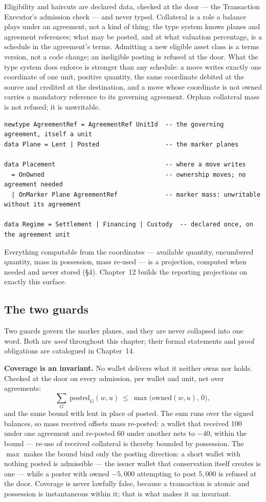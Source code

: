Eligibility and haircuts are declared data, checked at the door --- the
Transaction Executor's admission check --- and never typed. Collateral is a
role a balance plays under an agreement, not a kind of thing: the type system
knows planes and agreement references; what may be posted, and at what
valuation percentage, is a schedule in the agreement's terms. Admitting a new
eligible asset class is a terms version, not a code change; an ineligible
posting is refused at the door. What the type system does enforce is stronger
than any schedule: a move writes exactly one coordinate of one unit, positive
quantity, the same coordinate debited at the source and credited at the
destination, and a move whose coordinate is not owned carries a mandatory
reference to its governing agreement. Orphan collateral mass is not refused;
it is unwritable.

\begin{lstlisting}
newtype AgreementRef = AgreementRef UnitId  -- the governing agreement, itself a unit
data Plane = Lent | Posted                  -- the marker planes

data Placement                              -- where a move writes
  = OnOwned                                 -- ownership moves; no agreement needed
  | OnMarker Plane AgreementRef             -- marker mass: unwritable without its agreement

data Regime = Settlement | Financing | Custody  -- declared once, on the agreement unit
\end{lstlisting}

Everything computable from the coordinates --- available quantity, encumbered
quantity, mass in possession, mass re-used --- is a projection, computed when
needed and never stored (\S4). Chapter~12 builds the reporting projections on
exactly this surface.

\subsection{The two guards}

Two guards govern the marker planes, and they are never collapsed into one
word. Both are \emph{used} throughout this chapter; their formal statements and
proof obligations are catalogued in Chapter~14.

\textbf{Coverage is an invariant.} No wallet delivers what it neither owns nor
holds. Checked at the door on every admission, per wallet and unit, net over
agreements:
\[
\sum_{G}\ \mathrm{posted}_G(w,u)\ \le\ \max\bigl(\mathrm{owned}(w,u),\,0\bigr),
\]
and the same bound with lent in place of posted. The sum runs over the signed
balances, so mass received offsets mass re-posted: a wallet that received 100
under one agreement and re-posted 60 under another nets to $-40$, within the
bound --- re-use of received collateral is thereby bounded by possession. The
$\max$ makes the bound bind only the posting direction: a short wallet with
nothing posted is admissible --- the issuer wallet that conservation itself
creates is one --- while a poster with owned $-5{,}000$ attempting to post
$5{,}000$ is refused at the door. Coverage is never lawfully false, because a
transaction is atomic and possession is instantaneous within it; that is what
makes it an invariant.

